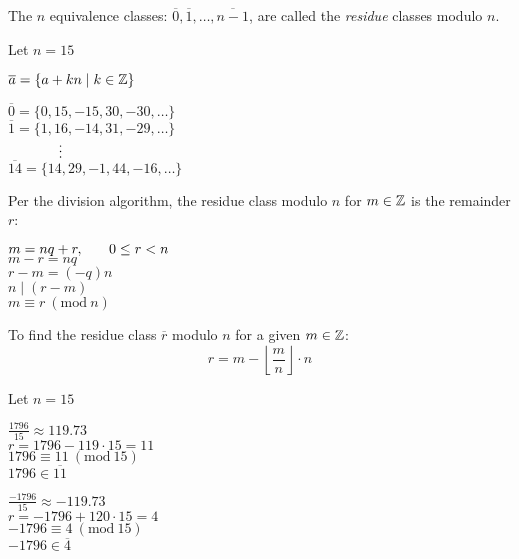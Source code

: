 \documentclass[letterpaper,12pt,fleqn]{article}
\newcommand{\emod}[3]{#1\equiv#2\ (\mbox{mod}\ #3)}
\newcommand{\ec}[1]{\overline{#1}}
\begin{document}
The $n$ equivalence classes: $\ec{0},\ec{1},\ldots,\ec{n-1}$, are called the
\emph{residue} classes modulo $n$.
\begin{example}
Let $n=15$

$\ec{a}=\{a+kn\mid k\in\Z\}$

$\ec{0}=\{0,15,-15,30,-30,\ldots\}$ \\
$\ec{1}=\{1,16,-14,31,-29,\ldots\}$ \\
$\hspace{0.5in}\vdots$ \\
$\ec{14}=\{14,29,-1,44,-16,\ldots\}$ \\
\end{example}
Per the division algorithm, the residue class modulo $n$ for $m\in\mathbb{Z}$ is the
remainder $r$:
\begin{adjustwidth}{0.5in}{\rightskip}
$m=nq+r,\hspace{0.25in} 0\le r<n$ \\
$m-r=nq$ \\
$r-m=(-q)n$ \\
$n\mid(r-m)$ \\
$\emod{m}{r}{n}$ \\
\end{adjustwidth}
To find the residue class $\ec{r}$ modulo $n$ for a given $m\in\mathbb{Z}$:
\[r=m-\left\lfloor\frac{m}{n}\right\rfloor\cdot n\]
\newpage
\begin{example}
Let $n=15$

\bigskip

$\frac{1796}{15}\approx119.73$ \\
$r=1796-119\cdot 15=11$ \\
$\emod{1796}{11}{15}$ \\
$1796\in\ec{11}$

\bigskip

$\frac{-1796}{15}\approx-119.73$ \\
$r=-1796+120\cdot 15=4$ \\
$\emod{-1796}{4}{15}$ \\
$-1796\in\ec{4}$
\end{example}
\end{document}
